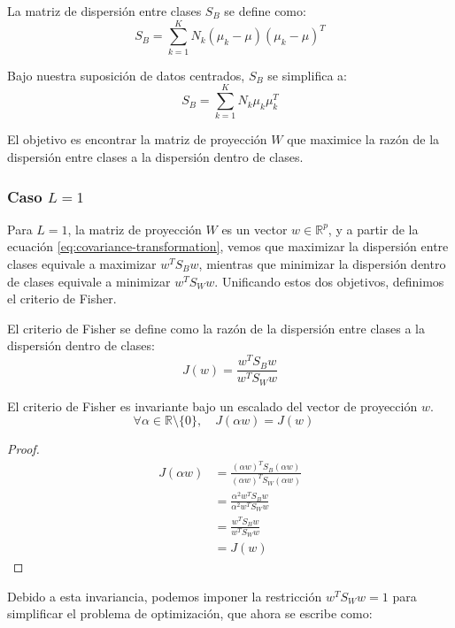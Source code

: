 \begin{definition}
La matriz de dispersión entre clases $S_B$ se define como:
\[
S_B = \sum_{k=1}^K N_k (\mu_k - \mu)(\mu_k - \mu)^T
\]
\end{definition}

Bajo nuestra suposición de datos centrados, $S_B$ se simplifica a:
\[
S_B = \sum_{k=1}^K N_k \mu_k \mu_k^T
\]

El objetivo es encontrar la matriz de proyección $W$ que maximice la razón de la dispersión entre clases a la dispersión dentro de clases.

\subsubsection{Caso $L=1$}

Para $L=1$, la matriz de proyección $W$ es un vector $w \in \mathbb{R}^p$, y a partir de la ecuación \ref{eq:covariance-transformation}, vemos que maximizar la dispersión entre clases equivale a maximizar $w^T S_B w$, mientras que minimizar la dispersión dentro de clases equivale a minimizar $w^T S_W w$. Unificando estos dos objetivos, definimos el criterio de Fisher.

\begin{definition}
El criterio de Fisher se define como la razón de la dispersión entre clases a la dispersión dentro de clases:
\[
J(w) = \frac{w^T S_B w}{w^T S_W w}
\]
\end{definition}

\begin{theorem}
El criterio de Fisher es invariante bajo un escalado del vector de proyección $w$.
\[
\forall \alpha \in \mathbb{R} \setminus \{0\}, \quad J(\alpha w) = J(w) \quad
\]
\end{theorem}

\begin{proof}
\begin{align*}
J(\alpha w) &= \frac{(\alpha w)^T S_B (\alpha w)}{(\alpha w)^T S_W (\alpha w)} \\
& = \frac{\alpha^2 w^T S_B w}{\alpha^2 w^T S_W w} \\
& = \frac{w^T S_B w}{w^T S_W w} \\
& = J(w)
\end{align*}
\end{proof}

Debido a esta invariancia, podemos imponer la restricción $w^T S_W w = 1$ para simplificar el problema de optimización, que ahora se escribe como:

